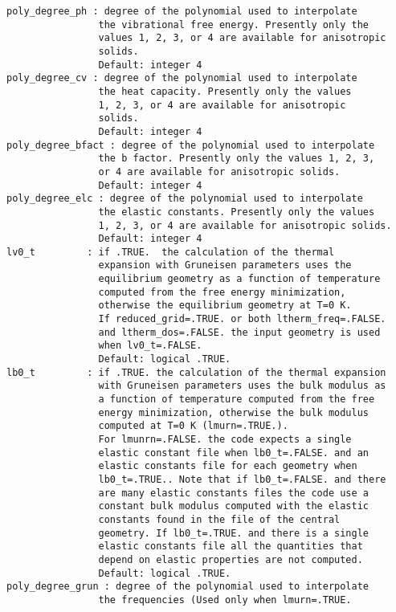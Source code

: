 \documentclass[12pt,a4paper,twoside]{report}
\begin{document}
\begin{verbatim}
poly_degree_ph : degree of the polynomial used to interpolate 
                the vibrational free energy. Presently only the 
                values 1, 2, 3, or 4 are available for anisotropic 
                solids. 
                Default: integer 4
poly_degree_cv : degree of the polynomial used to interpolate 
                the heat capacity. Presently only the values 
                1, 2, 3, or 4 are available for anisotropic 
                solids.
                Default: integer 4
poly_degree_bfact : degree of the polynomial used to interpolate 
                the b factor. Presently only the values 1, 2, 3, 
                or 4 are available for anisotropic solids.
                Default: integer 4
poly_degree_elc : degree of the polynomial used to interpolate 
                the elastic constants. Presently only the values 
                1, 2, 3, or 4 are available for anisotropic solids.
                Default: integer 4
lv0_t         : if .TRUE.  the calculation of the thermal 
                expansion with Gruneisen parameters uses the 
                equilibrium geometry as a function of temperature 
                computed from the free energy minimization, 
                otherwise the equilibrium geometry at T=0 K. 
                If reduced_grid=.TRUE. or both ltherm_freq=.FALSE. 
                and ltherm_dos=.FALSE. the input geometry is used 
                when lv0_t=.FALSE.
                Default: logical .TRUE.
lb0_t         : if .TRUE. the calculation of the thermal expansion 
                with Gruneisen parameters uses the bulk modulus as 
                a function of temperature computed from the free 
                energy minimization, otherwise the bulk modulus 
                computed at T=0 K (lmurn=.TRUE.). 
                For lmunrn=.FALSE. the code expects a single 
                elastic constant file when lb0_t=.FALSE. and an 
                elastic constants file for each geometry when 
                lb0_t=.TRUE.. Note that if lb0_t=.FALSE. and there 
                are many elastic constants files the code use a 
                constant bulk modulus computed with the elastic 
                constants found in the file of the central 
                geometry. If lb0_t=.TRUE. and there is a single 
                elastic constants file all the quantities that 
                depend on elastic properties are not computed.
                Default: logical .TRUE.
poly_degree_grun : degree of the polynomial used to interpolate 
                the frequencies (Used only when lmurn=.TRUE. 

\end{verbatim}
\end{document}
